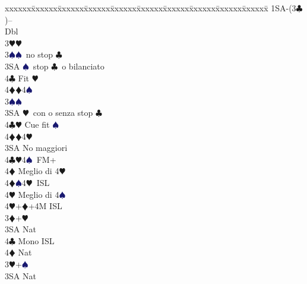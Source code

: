 \documentclass[a4paper,italian]{article}
\newcommand{\BC}{\textcolor{OliveGreen}{$\clubsuit$}}
\newcommand{\BD}{\textcolor{RedOrange}{$\vardiamondsuit$}}
\newcommand{\BH}{\textcolor{Red2}{$\varheartsuit${}}}
\newcommand{\BS}{\textcolor{MidnightBlue}{$\spadesuit${}}}
\newenvironment{bidtable}
{\begin{tabbing}

    xxxxxx\=xxxxxx\=xxxxxx\=xxxxxx\=xxxxxx\=xxxxxx\=xxxxxx\=xxxxxx\=xxxxxx\=xxxxxx\=\kill}
{\end{tabbing} }%
\begin{document}
\begin{multicols}{2}
\begin{itemize}
                                        \end{itemize}
                                        \columnbreak
                                        \begin{bidtable}
                                            1SA-(3\BC)--\+\\
                                            Dbl\+\\
                                            3\BH {}\BH \+\\
                                            3\BS {}\BS\ no stop \BC \\
                                            3SA \BS\ stop \BC\ o bilanciato\\
                                            4\BC \> Fit \BH \\
                                            4\BD {}\BD 4\BS \-\\
                                            3\BS {}\BS \+\\
                                            3SA \BH\ con o senza stop \BC \\
                                            4\BC\BH \> Cue fit \BS \\
                                            4\BD {}\BD 4\BH \-\\
                                            3SA \> No maggiori\+\\
                                            4\BC {}\BH 4\BS\ FM+\+\\
                                            4\BD \> Meglio di 4\BH \-\\
                                            4\BD {}\BS 4\BH\ ISL\+\\
                                            4\BH \> Meglio di 4\BS \-\\
                                            4\BH {}+\BD +4M ISL\-\-\\
                                            3\BD {}+\BH \+\\
                                            3SA \> Nat\+\\
                                            4\BC \> Mono ISL\\
                                            4\BD \> Nat\-\-\\
                                            3\BH {}+\BS \+\\
                                            3SA \> Nat\+\\

\end{bidtable}
\end{multicols}
\end{document}
